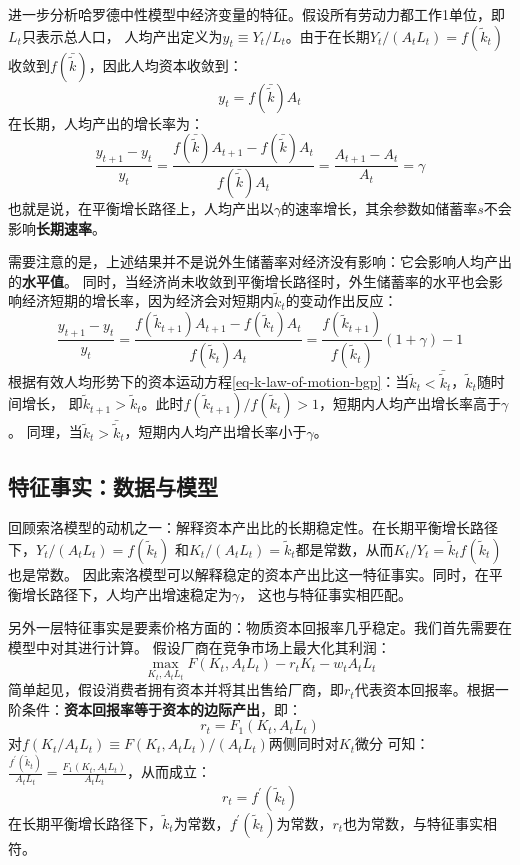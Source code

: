 进一步分析哈罗德中性模型中经济变量的特征。假设所有劳动力都工作1单位，即$L_t$只表示总人口，
人均产出定义为$y_t\equiv Y_t/L_t$。由于在长期$Y_t /\left(A_t L_t\right)=f(\tilde{k}_t)$
收敛到$f(\bar{\tilde{k}})$，因此人均资本收敛到：
\begin{equation*}
    y_t = f(\bar{\tilde{k}})A_t
\end{equation*}
在长期，人均产出的增长率为：
\begin{equation*}
    \frac{y_{t+1}-y_t}{y_t}=\frac{f(\bar{\tilde{k}}) A_{t+1}-f(\bar{\tilde{k}}) A_t}{f(\bar{\tilde{k}}) A_t}
        =\frac{A_{t+1}-A_t}{A_t}=\gamma
\end{equation*}
也就是说，在平衡增长路径上，人均产出以$\gamma$的速率增长，其余参数如储蓄率$s$不会影响\textbf{长期速率}。

需要注意的是，上述结果并不是说外生储蓄率对经济没有影响：它会影响人均产出的\textbf{水平值}。
同时，当经济尚未收敛到平衡增长路径时，外生储蓄率的水平也会影响经济短期的增长率，因为经济会对短期内$\tilde{k}_t$的变动作出反应：
\begin{equation*}
    \frac{y_{t+1}-y_t}{y_t} = 
        \frac{f(\tilde{k}_{t+1}) A_{t+1}-f(\tilde{k}_t) A_t}{f(\tilde{k}_t) A_t} = 
            \frac{f(\tilde{k}_{t+1})}{f(\tilde{k}_t)}(1+\gamma)-1
\end{equation*}
根据有效人均形势下的资本运动方程\cref{eq-k-law-of-motion-bgp}：当$\tilde{k}_t<\bar{\tilde{k}}_t$，$\tilde{k}_t$随时间增长，
即$\tilde{k}_{t+1}>\tilde{k}_t$。此时$f(\tilde{k}_{t+1})/f(\tilde{k}_t)>1$，短期内人均产出增长率高于$\gamma$。
同理，当$\tilde{k}_t>\bar{\tilde{k}}_t$，短期内人均产出增长率小于$\gamma$。


\subsection{特征事实：数据与模型}

回顾索洛模型的动机之一：解释资本产出比的长期稳定性。在长期平衡增长路径下，$Y_t/(A_tL_t) = f(\tilde{k}_t)$
和$K_t/(A_tL_t)=\tilde{k}_t$都是常数，从而$K_t/Y_t=\tilde{k}_tf(\tilde{k}_t)$也是常数。
因此索洛模型可以解释稳定的资本产出比这一特征事实。同时，在平衡增长路径下，人均产出增速稳定为$\gamma$，
这也与特征事实相匹配。

另外一层特征事实是要素价格方面的：物质资本回报率几乎稳定。我们首先需要在模型中对其进行计算。
假设厂商在竞争市场上最大化其利润：
\begin{equation}
    \max _{K_t, A_t L_t} F\left(K_t, A_t L_t\right)-r_t K_t-w_t A_t L_t
\end{equation}
简单起见，假设消费者拥有资本并将其出售给厂商，即$r_t$代表资本回报率。根据一阶条件：\textbf{资本回报率等于资本的边际产出}，即：
\begin{equation*}
    r_t = F_1\left(K_t, A_tL_t\right) 
\end{equation*}
对$f(K_t/A_tL_t) \equiv F\left(K_t, A_tL_t\right)/(A_tL_t)$两侧同时对$K_t$微分
可知：$\frac{f^{\prime}(\tilde{k}_t)}{A_tL_t}=\frac{F_1\left(K_t, A_tL_t\right)}{A_tL_t}$，从而成立：
\begin{equation*}
    r_t = f^{\prime}(\tilde{k}_t)
\end{equation*}
在长期平衡增长路径下，$\tilde{k}_t$为常数，$f^{\prime}(\tilde{k}_t)$为常数，$r_t$也为常数，与特征事实相符。


